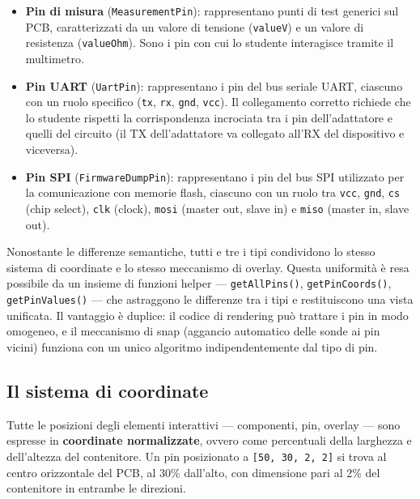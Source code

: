 \begin{itemize}
    \item \textbf{Pin di misura} (\texttt{MeasurementPin}): rappresentano punti di test generici sul PCB, caratterizzati da un valore di tensione (\texttt{valueV}) e un valore di resistenza (\texttt{valueOhm}). Sono i pin con cui lo studente interagisce tramite il multimetro.

    \item \textbf{Pin UART} (\texttt{UartPin}): rappresentano i pin del bus seriale UART, ciascuno con un ruolo specifico (\texttt{tx}, \texttt{rx}, \texttt{gnd}, \texttt{vcc}). Il collegamento corretto richiede che lo studente rispetti la corrispondenza incrociata tra i pin dell'adattatore e quelli del circuito (il TX dell'adattatore va collegato all'RX del dispositivo e viceversa).

    \item \textbf{Pin SPI} (\texttt{FirmwareDumpPin}): rappresentano i pin del bus SPI utilizzato per la comunicazione con memorie flash, ciascuno con un ruolo tra \texttt{vcc}, \texttt{gnd}, \texttt{cs} (chip select), \texttt{clk} (clock), \texttt{mosi} (master out, slave in) e \texttt{miso} (master in, slave out).
\end{itemize}

Nonostante le differenze semantiche, tutti e tre i tipi condividono lo stesso sistema di coordinate e lo stesso meccanismo di overlay. Questa uniformità è resa possibile da un insieme di funzioni helper --- \texttt{getAllPins()}, \texttt{getPinCoords()}, \texttt{getPinValues()} --- che astraggono le differenze tra i tipi e restituiscono una vista unificata. Il vantaggio è duplice: il codice di rendering può trattare i pin in modo omogeneo, e il meccanismo di snap (aggancio automatico delle sonde ai pin vicini) funziona con un unico algoritmo indipendentemente dal tipo di pin.

\subsection{Il sistema di coordinate}

Tutte le posizioni degli elementi interattivi --- componenti, pin, overlay --- sono espresse in \textbf{coordinate normalizzate}, ovvero come percentuali della larghezza e dell'altezza del contenitore. Un pin posizionato a \texttt{[50, 30, 2, 2]} si trova al centro orizzontale del PCB, al 30\% dall'alto, con dimensione pari al 2\% del contenitore in entrambe le direzioni.

